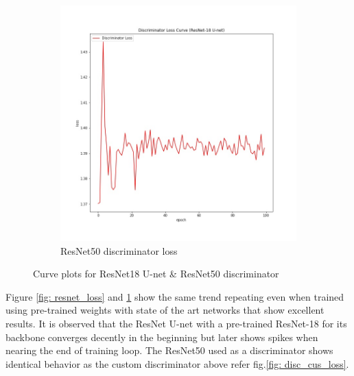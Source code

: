 \documentclass[oneside,a4paper,12pt]{report}
\begin{document}
\begin{figure}[!htb]
\begin{subfigure}[b]{0.3\textwidth}
		\includegraphics[width=\textwidth]{figures/resnet18_discriminator_loss}
		\caption{ResNet50 discriminator loss}
		\label{fig: resnet50_disc_loss}
	\end{subfigure}
	\caption{Curve plots for ResNet18 U-net \& ResNet50 discriminator}
	\label{fig: resnet18_curves}
\end{figure}

Figure \ref{fig: resnet_loss} and \ref{fig: resnet50_disc_loss} show the same trend repeating even when trained using pre-trained weights with state of the art networks that show excellent results. It is observed that the ResNet U-net with a pre-trained ResNet-18 for its backbone converges decently in the beginning but later shows spikes when nearing the end of training loop. The ResNet50 used as a discriminator shows identical behavior as the custom discriminator above refer fig.\ref{fig: disc_cus_loss}. 
\end{document}
